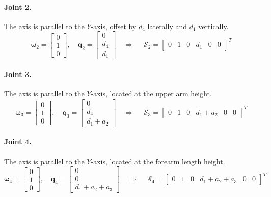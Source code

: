 \documentclass[11pt]{article}
\begin{document}
\paragraph{Joint 2.}
The axis is parallel to the $Y$-axis, offset by $d_4$ laterally and $d_1$ vertically.
\begin{equation}
  \mathbf{\omega}_2 = \begin{bmatrix} 0 \\ 1 \\ 0 \end{bmatrix}, \quad \mathbf{q}_2 = \begin{bmatrix} 0 \\ d_4 \\ d_1 \end{bmatrix} \quad \Rightarrow \quad \boxed{\;\mathcal{S}_2 = \begin{bmatrix} 0 & 1 & 0 & d_1 & 0 & 0 \end{bmatrix}^T\;}
\end{equation}

\paragraph{Joint 3.}
The axis is parallel to the $Y$-axis, located at the upper arm height.
\begin{equation}
  \mathbf{\omega}_3 = \begin{bmatrix} 0 \\ 1 \\ 0 \end{bmatrix}, \quad \mathbf{q}_3 = \begin{bmatrix} 0 \\ d_4 \\ d_1+a_2 \end{bmatrix} \quad \Rightarrow \quad \boxed{\;\mathcal{S}_3 = \begin{bmatrix} 0 & 1 & 0 & d_1+a_2 & 0 & 0 \end{bmatrix}^T\;}
\end{equation}

\paragraph{Joint 4.}
The axis is parallel to the $Y$-axis, located at the forearm length height.
\begin{equation}
  \mathbf{\omega}_4 = \begin{bmatrix} 0 \\ 1 \\ 0 \end{bmatrix}, \quad \mathbf{q}_4 = \begin{bmatrix} 0 \\ 0 \\ d_1+a_2+a_3 \end{bmatrix} \quad \Rightarrow \quad \boxed{\;\mathcal{S}_4 = \begin{bmatrix} 0 & 1 & 0 & d_1+a_2+a_3 & 0 & 0 \end{bmatrix}^T\;}
\end{equation}
\end{document}
